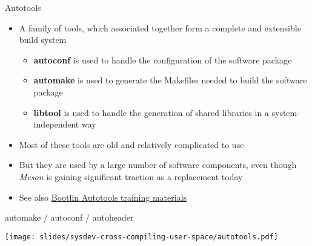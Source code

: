 \begin{frame}{Autotools}
  \begin{itemize}
  \item A family of tools, which associated together form a complete
    and extensible build system
    \begin{itemize}
    \item {\bf autoconf} is used to handle the configuration of the
      software package
    \item {\bf automake} is used to generate the Makefiles needed to
      build the software package
    \item {\bf libtool} is used to handle the generation of shared
      libraries in a system-independent way
    \end{itemize}
  \item Most of these tools are old and relatively complicated to use
  \item But they are used by a large number of software components,
    even though {\em Meson} is gaining significant traction as a
    replacement today
  \item See also
    \href{https://bootlin.com/doc/training/autotools/}{Bootlin
      Autotools training materials}
  \end{itemize}
\end{frame}

\begin{frame}{automake / autoconf / autoheader}
  \begin{center}
    \texttt{[image: slides/sysdev-cross-compiling-user-space/autotools.pdf]}
  \end{center}
\end{frame}

